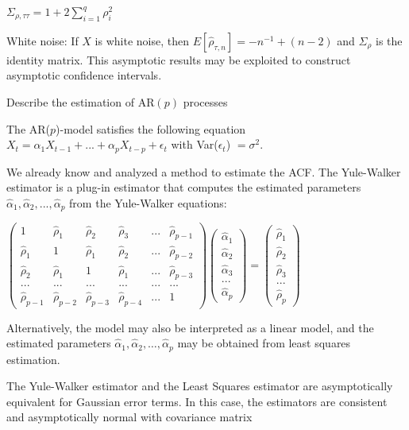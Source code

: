 \(\Sigma_{\rho, \tau \tau} = 1 + 2 \sum_{i = 1}^q \rho_i^2\)

White noise:
If \(X\) is white noise, then \(E[\hat{\rho}_{\tau, n}] = -n^{-1} + (n - 2)\) and \(\Sigma_\rho\) is the identity matrix.
This asymptotic results may be exploited to construct asymptotic confidence intervals.


Describe the estimation of \( \text{AR}(p) \) processes

The AR(\(p\))-model satisfies the following equation
\(X_t = \alpha_1 X_{t - 1} + ... + \alpha_p X_{t - p} + \epsilon_t\)
with Var(\(\epsilon_t\)) \(= \sigma^2\).

We already know and analyzed a method to estimate the ACF.
The Yule-Walker estimator is a plug-in estimator that computes the estimated parameters \(\hat{\alpha}_1, \hat{\alpha}_2, ..., \hat{\alpha}_p\) from the Yule-Walker equations:

\(\begin{pmatrix} 1 & \hat{\rho}_1 & \hat{\rho}_2 & \hat{\rho}_3 & ... & \hat{\rho}_{p - 1} \\ \hat{\rho}_1 & 1 & \hat{\rho}_1 & \hat{\rho}_2 & ... & \hat{\rho}_{p - 2} \\ \hat{\rho}_2 & \hat{\rho}_1 & 1 & \hat{\rho}_1 & ... & \hat{\rho}_{p - 3} \\ ... & ... & ... & ... & ... & ... \\ \hat{\rho}_{p - 1} & \hat{\rho}_{p - 2} & \hat{\rho}_{p - 3} & \hat{\rho}_{p - 4} & ... & 1 \end{pmatrix} \begin{pmatrix} \hat{\alpha}_1 \\ \hat{\alpha}_2 \\ \hat{\alpha}_3 \\ ... \\ \hat{\alpha}_p \end{pmatrix} = \begin{pmatrix} \hat{\rho}_1 \\ \hat{\rho}_2 \\ \hat{\rho}_3 \\ ... \\ \hat{\rho}_p \end{pmatrix}\)

Alternatively, the model may also be interpreted as a linear model, and the estimated parameters
\( \hat{\alpha}_1, \hat{\alpha}_2, \dots, \hat{\alpha}_p \) may be obtained from least squares estimation.

The Yule-Walker estimator and the Least Squares estimator are asymptotically equivalent for Gaussian error terms.
In this case, the estimators are consistent and asymptotically normal with covariance matrix

